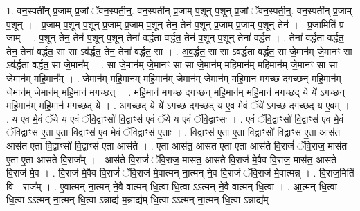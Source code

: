 \documentclass[17pt]{extarticle}
\begin{document}
1. वन॒स्पती᳚न् प्र॒जाम् प्र॒जां ॅवन॒स्पती॒न्॒. वन॒स्पती᳚न् प्र॒जाम् प॒शून् प॒शून् प्र॒जां ॅवन॒स्पती॒न्॒. वन॒स्पती᳚न् प्र॒जाम् प॒शून् । . प्र॒जाम् प॒शून् प॒शून् प्र॒जाम् प्र॒जाम् प॒शून् तेन॒ तेन॑ प॒शून् प्र॒जाम् प्र॒जाम् प॒शून् तेन॑ । . प्र॒जामिति॑ प्र - जाम् । . प॒शून् तेन॒ तेन॑ प॒शून् प॒शून् तेना॑ वर्द्धता वर्द्धत॒ तेन॑ प॒शून् प॒शून् तेना॑ वर्द्धत । . तेना॑ वर्द्धता वर्द्धत॒ तेन॒ तेना॑ वर्द्धत॒ सा सा ऽव॑र्द्धत॒ तेन॒ तेना॑ वर्द्धत॒ सा । . अ॒व॒र्द्ध॒त॒ सा सा ऽव॑र्द्धता वर्द्धत॒ सा जे॒मान॑म् जे॒मानꣳ॒॒ सा ऽव॑र्द्धता वर्द्धत॒ सा जे॒मान᳚म् । . सा जे॒मान॑म् जे॒मानꣳ॒॒ सा सा जे॒मान॑म् महि॒मान॑म् महि॒मान॑म् जे॒मानꣳ॒॒ सा सा जे॒मान॑म् महि॒मान᳚म् । . जे॒मान॑म् महि॒मान॑म् महि॒मान॑म् जे॒मान॑म् जे॒मान॑म् महि॒मान॑ मगच्छ दगच्छन् महि॒मान॑म् जे॒मान॑म् जे॒मान॑म् महि॒मान॑ मगच्छत् । . म॒हि॒मान॑ मगच्छ दगच्छन् महि॒मान॑म् महि॒मान॑ मगच्छ॒द् ये ये॑ ऽगच्छन् महि॒मान॑म् महि॒मान॑ मगच्छ॒द् ये । . अ॒ग॒च्छ॒द् ये ये॑ ऽगच्छ दगच्छ॒द् य ए॒व मे॒वं ॅये॑ ऽगच्छ दगच्छ॒द् य ए॒वम् । . य ए॒व मे॒वं ॅये य ए॒वं ॅवि॒द्वाꣳसो॑ वि॒द्वाꣳस॑ ए॒वं ॅये य ए॒वं ॅवि॒द्वाꣳसः॑ । . ए॒वं ॅवि॒द्वाꣳसो॑ वि॒द्वाꣳस॑ ए॒व मे॒वं ॅवि॒द्वाꣳस॑ ए॒ता ए॒ता वि॒द्वाꣳस॑ ए॒व मे॒वं ॅवि॒द्वाꣳस॑ ए॒ताः । . वि॒द्वाꣳस॑ ए॒ता ए॒ता वि॒द्वाꣳसो॑ वि॒द्वाꣳस॑ ए॒ता आस॑त॒ आस॑त ए॒ता वि॒द्वाꣳसो॑ वि॒द्वाꣳस॑ ए॒ता आस॑ते । . ए॒ता आस॑त॒ आस॑त ए॒ता ए॒ता आस॑ते वि॒राजं॑ ॅवि॒राज॒ मास॑त ए॒ता ए॒ता आस॑ते वि॒राज᳚म् । . आस॑ते वि॒राजं॑ ॅवि॒राज॒ मास॑त॒ आस॑ते वि॒राज॑ मे॒वैव वि॒राज॒ मास॑त॒ आस॑ते वि॒राज॑ मे॒व । . वि॒राज॑ मे॒वैव वि॒राजं॑ ॅवि॒राज॑ मे॒वात्मन् ना॒त्मन् ने॒व वि॒राजं॑ ॅवि॒राज॑ मे॒वात्मन्न् । . वि॒राज॒मिति॑ वि - राज᳚म् । . ए॒वात्मन् ना॒त्मन् ने॒वै वात्मन् धि॒त्वा धि॒त्वा ऽऽत्मन् ने॒वै वात्मन् धि॒त्वा । . आ॒त्मन् धि॒त्वा धि॒त्वा ऽऽत्मन् ना॒त्मन् धि॒त्वा ऽन्नाद्य॑ म॒न्नाद्य॑म् धि॒त्वा ऽऽत्मन् ना॒त्मन् धि॒त्वा ऽन्नाद्य᳚म् । \newline
\end{document}
